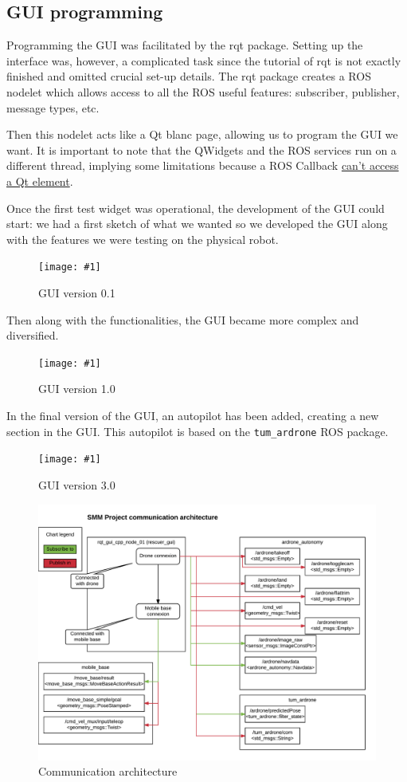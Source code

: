 \documentclass[11pt,a4paper]{article}
\newcommand{\centerFigure}[2]{
\begin{figure}[h]	
\centering
\texttt{[image: \#1]}
\caption{#2}
\end{figure}
}
\begin{document}
\subsection{GUI programming}
Programming the GUI was facilitated by the rqt package. Setting up the interface was, however,
 a complicated task since the tutorial of rqt is not exactly finished and omitted crucial set-up details. The rqt package creates a ROS nodelet which allows access to
all the ROS useful features: subscriber, publisher, message types, etc.

Then this nodelet acts like a Qt blanc page, allowing us to program the GUI we want. It is 
important to note that the QWidgets and the ROS services run on a different thread, implying some limitations because a ROS Callback
\href{http://wiki.ros.org/rqt/Tutorials/Writing\%20a\%20C\%2B\%2B\%20Plugin}
{can't access a Qt element}.

Once the first test widget was operational, the development of the GUI could start: we had a 
first sketch of what we wanted so we developed the GUI along with the features we were
testing on the physical robot.
\centerFigure{guiSketch.png}{GUI version 0.1}

Then along with the functionalities, the GUI became more complex and diversified.
\centerFigure{guiV2.png}{GUI version 1.0}

In the final version of the GUI, an autopilot has been added, creating a new section in the 
GUI. This autopilot is based on the \verb!tum_ardrone! ROS package.
\centerFigure{guiV3.png}{GUI version 3.0}

\begin{figure}[h]	
\centering
\includegraphics[width=14cm]{communicationArchitecture.png}
\caption{Communication architecture}
\end{figure}
\end{document}
